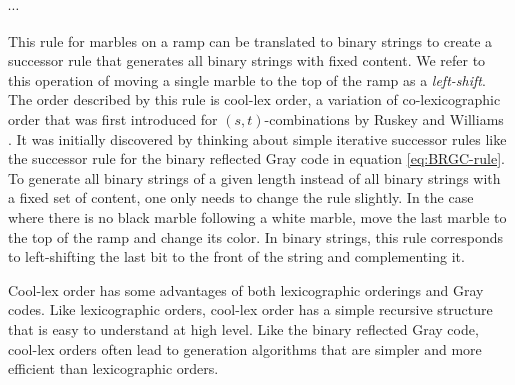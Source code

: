 



  





$\cdots$



This rule for marbles on a ramp can be translated to binary strings to create a successor rule that generates all binary strings with fixed content.  We refer to this operation of moving a single marble to the top of the ramp as a \emph{left-shift}.
The order described by this rule is 
cool-lex order, a variation of co-lexicographic order that was first introduced for $(s,t)$-combinations by Ruskey and Williams \cite{ruskey2005generating} \cite{ruskey2008generating}.  It was initially discovered by thinking about simple iterative successor rules like the successor rule for the binary reflected Gray code in equation \ref{eq:BRGC-rule}. To generate all binary strings of a given length instead of all binary strings with a fixed set of content, one only needs to change the rule slightly.  In the case where there is no black marble following a white marble, move the last marble to the top of the ramp and change its color.  In binary strings, this rule corresponds to left-shifting the last bit to the front of the string and complementing it.

Cool-lex order has some advantages of both lexicographic orderings and Gray codes.  Like lexicographic orders, cool-lex order has a simple recursive structure that is easy to understand at  high level.  
Like the binary reflected Gray code, cool-lex orders often lead to generation algorithms that are simpler and more efficient than lexicographic orders.   %

